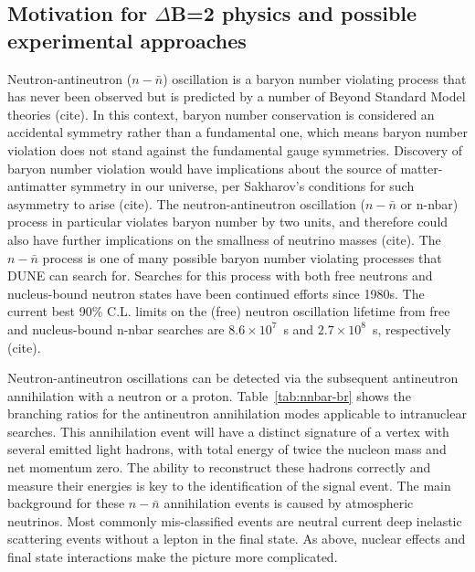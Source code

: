 \subsection{Motivation for $\Delta$B=2 physics and possible experimental approaches}
\label{subsec:nonaccel-nnbar-intro}

Neutron-antineutron ($n - \bar{n}$) oscillation is a baryon number violating process that
has never been observed but is predicted by a number of Beyond Standard Model
theories (cite). In this context, baryon number conservation is considered an accidental
symmetry rather than a fundamental one, which means baryon number violation
does not stand against the fundamental gauge symmetries. Discovery of baryon
number violation would have implications about the source of matter-antimatter
symmetry in our universe, per Sakharov’s conditions for such asymmetry to arise (cite).
The neutron-antineutron oscillation ($n - \bar{n}$ or n-nbar) process in particular violates
baryon number by two units, and therefore could also have further implications on
the smallness of neutrino masses (cite). The $n - \bar{n}$ process is one of many possible baryon number violating processes that DUNE can search for. Searches for this process with
both free neutrons and nucleus-bound neutron states have been continued efforts
since 1980s. The current best 90\% C.L. limits on the (free) neutron oscillation
lifetime from free and nucleus-bound n-nbar searches are $8.6\times10^7$~s and $2.7\times 10^8$~s, respectively (cite).

Neutron-antineutron oscillations can be detected via the subsequent antineutron annihilation with a neutron or a proton. Table~\ref{tab:nnbar-br} shows the branching ratios for the antineutron annihilation modes applicable to intranuclear searches.  This annihilation event will have a distinct signature of a vertex with several emitted light hadrons, with total energy of twice the nucleon mass and net momentum zero. The ability to reconstruct these hadrons correctly and measure their energies is key to the identification of the signal event. The main background for these $n - \bar{n}$ annihilation events is caused by atmospheric neutrinos. Most commonly mis-classified events are neutral current deep inelastic scattering events without a lepton in the final state. As above, nuclear effects and final state interactions make the picture more complicated.

